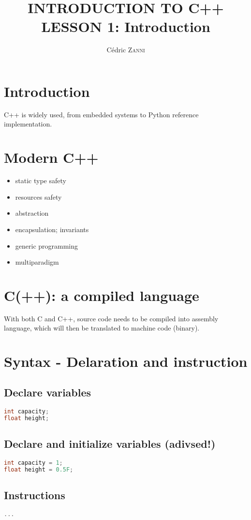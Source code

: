 \documentclass[11pt]{article}
\begin{document}
    \title{\small INTRODUCTION TO C++ \\ \LARGE LESSON 1: Introduction}
    \author{Cédric \textsc{Zanni}}

    \maketitle

    \section{Introduction}

    C++ is widely used, from embedded systems to Python reference implementation.

    \section{Modern C++}

    \begin{itemize}
        \item static type safety
        \item resources safety
        \item abstraction
        \item encapsulation; invariants
        \item generic programming
        \item multiparadigm
    \end{itemize}

    \section{C(++): a compiled language}

    With both C and C++, source code needs to be compiled into assembly language, which will then be translated to machine code (binary).

    \section{Syntax - Delaration and instruction}

    \subsection{Declare variables}
    \begin{lstlisting}[language=C]
int capacity;
float height;
    \end{lstlisting}

    \subsection{Declare and initialize variables (adivsed!)}
    \begin{lstlisting}[language=C]
int capacity = 1;
float height = 0.5F;
    \end{lstlisting}

    \subsection{Instructions}
    \begin{lstlisting}[language=C]
...
    \end{lstlisting}
\end{document}
